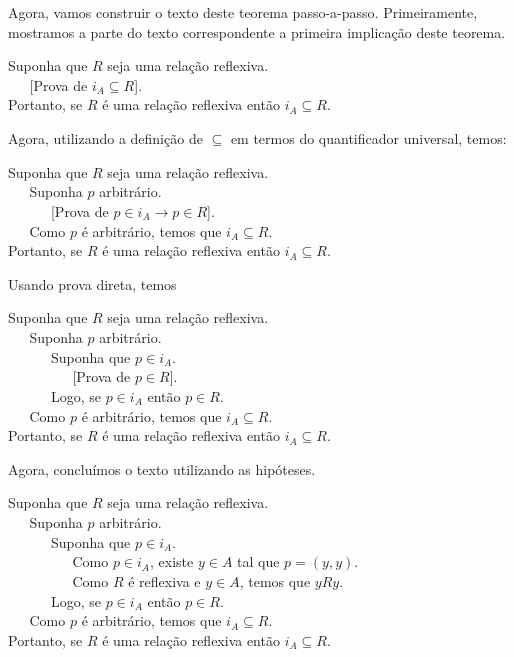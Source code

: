 \begin{Example}
Agora, vamos construir o texto deste teorema
passo-a-passo. Primeiramente, mostramos a parte do texto
correspondente a primeira implicação deste teorema.
\begin{flushleft}
Suponha que $R$ seja uma relação reflexiva.\\
\verb|   |[Prova de $i_{A}\subseteq R$].\\
Portanto, se $R$ é uma relação reflexiva então $i_{A} \subseteq R$.
\end{flushleft}
Agora, utilizando a definição de $\subseteq$ em termos do
quantificador universal, temos:
\begin{flushleft}
Suponha que $R$ seja uma relação reflexiva.\\
\verb|   |Suponha $p$ arbitrário.\\
\verb|      |[Prova de $p \in i_{A} \to p \in R$].\\
\verb|   |Como $p$ é arbitrário, temos que $i_{A} \subseteq R$.\\
Portanto, se $R$ é uma relação reflexiva então $i_{A} \subseteq R$.
\end{flushleft}
Usando prova direta, temos
\begin{flushleft}
Suponha que $R$ seja uma relação reflexiva.\\
\verb|   |Suponha $p$ arbitrário.\\
\verb|      |Suponha que $p \in i_A$.\\
\verb|         |[Prova de $p \in R$].\\
\verb|      |Logo, se $p\in i_A$ então $p \in R$.\\
\verb|   |Como $p$ é arbitrário, temos que $i_{A} \subseteq R$.\\
Portanto, se $R$ é uma relação reflexiva então $i_{A} \subseteq R$.
\end{flushleft}
Agora, concluímos o texto utilizando as hipóteses.
\begin{flushleft}
Suponha que $R$ seja uma relação reflexiva.\\
\verb|   |Suponha $p$ arbitrário.\\
\verb|      |Suponha que $p \in i_A$.\\
\verb|         |Como $p\in i_A$, existe $y \in A$ tal que $p = (y,y)$.\\
\verb|         |Como $R$ é reflexiva e $y \in A$, temos que $yRy$.\\
\verb|      |Logo, se $p\in i_A$ então $p \in R$.\\
\verb|   |Como $p$ é arbitrário, temos que $i_{A} \subseteq R$.\\
Portanto, se $R$ é uma relação reflexiva então $i_{A} \subseteq R$.
\end{flushleft}
\end{Example}
